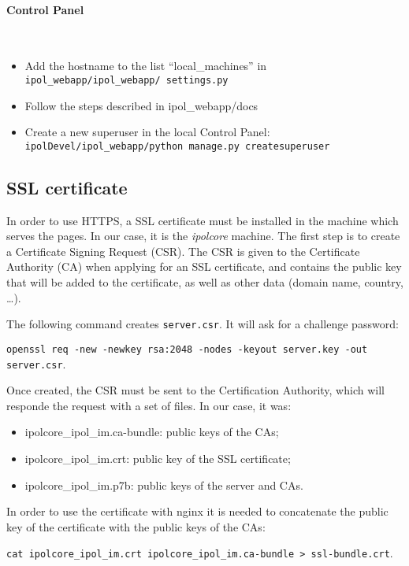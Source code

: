 \paragraph{Control Panel} \hspace{0pt} \\
\begin{itemize}
    \item Add the hostname to the list ``local\_machines'' in  {\tt ipol\_webapp/ipol\_webapp/ settings.py}
    \item Follow the steps described in ipol\_webapp/docs
    \item Create a new superuser in the local Control Panel: {\tt ipolDevel/ipol\_webapp/python manage.py createsuperuser}
\end{itemize}

\subsection{SSL certificate}
In order to use HTTPS, a SSL certificate must be installed in the machine which serves the pages. In our case, it is the \emph{ipolcore} machine.
The first step is to create a Certificate Signing Request (CSR). The CSR is given to the Certificate Authority (CA) when applying for an SSL certificate, and contains the public key that will be added to the certificate, as well as other data (domain name, country, \dots).

The following command creates {\tt server.csr}. It will ask for a challenge password:

{\tt openssl req -new -newkey rsa:2048 -nodes -keyout server.key -out server.csr}.

Once created, the CSR must be sent to the Certification Authority, which will responde the request with a set of files. In our case, it was:
\begin{itemize}
    \item ipolcore\_ipol\_im.ca-bundle: public keys of the CAs;
    \item ipolcore\_ipol\_im.crt: public key of the SSL certificate;
    \item ipolcore\_ipol\_im.p7b: public keys of the server and CAs.
\end{itemize}

In order to use the certificate with nginx it is needed to concatenate the public key of the certificate with the public keys of the CAs:

{\tt cat ipolcore\_ipol\_im.crt ipolcore\_ipol\_im.ca-bundle > ssl-bundle.crt}.


